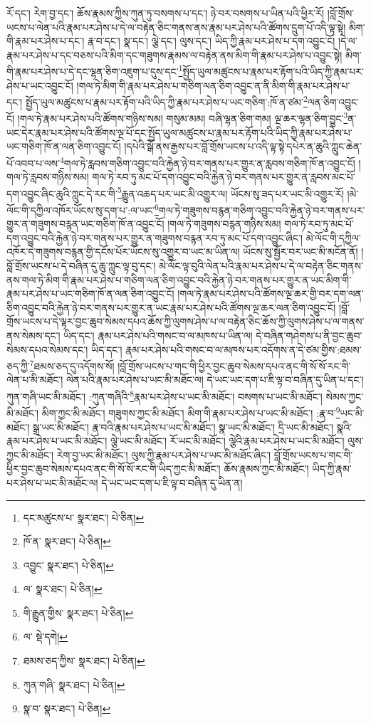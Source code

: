 རོ་དང་། རེག་བྱ་དང་། ཆོས་རྣམས་ཀྱིས་ཀུན་ཏུ་བསགས་པ་དང་། ཉེ་བར་བསགས་པ་ཡིན་པའི་ཕྱིར་རོ། །བློ་གྲོས་ཡངས་པ་ལེན་པའི་རྣམ་པར་ཤེས་པ་དེ་ལ་བརྟེན་ཅིང་གནས་ནས་རྣམ་པར་ཤེས་པའི་ཚོགས་དྲུག་པོ་འདི་ལྟ་སྟེ། མིག་གི་རྣམ་པར་ཤེས་པ་དང་། རྣ་བ་དང་། སྣ་དང་། ལྕེ་དང་། ལུས་དང་། ཡིད་ཀྱི་རྣམ་པར་ཤེས་པ་དག་འབྱུང་ངོ། །དེ་ལ་རྣམ་པར་ཤེས་པ་དང་བཅས་པའི་མིག་དང་གཟུགས་རྣམས་ལ་བརྟེན་ནས་མིག་གི་རྣམ་པར་ཤེས་པ་འབྱུང་སྟེ། མིག་གི་རྣམ་པར་ཤེས་པ་དེ་དང་ལྷན་ཅིག་འཇུག་པ་དུས་དང་\footnote{དང་མཚུངས་པ་  སྣར་ཐང་།  པེ་ཅིན། }སྤྱོད་ཡུལ་མཚུངས་པ་རྣམ་པར་རྟོག་པའི་ཡིད་ཀྱི་རྣམ་པར་ཤེས་པ་ཡང་འབྱུང་ངོ། །གལ་ཏེ་མིག་གི་རྣམ་པར་ཤེས་པ་གཅིག་ལན་ཅིག་འབྱུང་ན་ནི་མིག་གི་རྣམ་པར་ཤེས་པ་དང་། སྤྱོད་ཡུལ་མཚུངས་པ་རྣམ་པར་རྟོག་པའི་ཡིད་ཀྱི་རྣམ་པར་ཤེས་པ་ཡང་གཅིག་:ཁོ་ན་ཙམ་\footnote{ཁོ་ན་  སྣར་ཐང་།  པེ་ཅིན། }ལན་ཅིག་འབྱུང་ངོ། །གལ་ཏེ་རྣམ་པར་ཤེས་པའི་ཚོགས་གཉིས་སམ། གསུམ་མམ། བཞི་ལྷན་ཅིག་གམ། ལྔ་ཆར་ལྷན་ཅིག་བྱུང་\footnote{འབྱུང་  སྣར་ཐང་།  པེ་ཅིན། }ན་ཡང་དེར་རྣམ་པར་ཤེས་པའི་ཚོགས་ལྔ་པོ་དང་སྤྱོད་ཡུལ་མཚུངས་པ་རྣམ་པར་རྟོག་པའི་ཡིད་ཀྱི་རྣམ་པར་ཤེས་པ་ཡང་གཅིག་ཁོ་ན་ལན་ཅིག་འབྱུང་ངོ། །དཔེའི་སྒོ་ནས་རྒྱས་པར་བློ་གྲོས་ཡངས་པ་འདི་ལྟ་སྟེ་དཔེར་ན་ཆུའི་ཀླུང་ཆེན་པོ་འབབ་པ་ལས་\footnote{ལ་  སྣར་ཐང་།  པེ་ཅིན། }གལ་ཏེ་རླབས་གཅིག་འབྱུང་བའི་རྐྱེན་ཉེ་བར་གནས་པར་གྱུར་ན་རླབས་གཅིག་ཁོ་ན་འབྱུང་ངོ། །གལ་ཏེ་རླབས་གཉིས་སམ། གལ་ཏེ་རབ་ཏུ་མང་པོ་དག་འབྱུང་བའི་རྐྱེན་ཉེ་བར་གནས་པར་གྱུར་ན་རླབས་མང་པོ་དག་འབྱུང་ཞིང་ཆུའི་ཀླུང་དེ་རང་གི་\footnote{གི་རྒྱུན་གྱིས་  སྣར་ཐང་།  པེ་ཅིན། }རྒྱུན་འཆད་པར་ཡང་མི་འགྱུར་ལ། ཡོངས་སུ་ཟད་པར་ཡང་མི་འགྱུར་རོ། །མེ་ལོང་གི་དཀྱིལ་འཁོར་ཡོངས་སུ་དག་པ་:ལ་ཡང་\footnote{ལ་  སྡེ་དགེ། }གལ་ཏེ་གཟུགས་བརྙན་གཅིག་འབྱུང་བའི་རྐྱེན་ཉེ་བར་གནས་པར་གྱུར་ན་གཟུགས་བརྙན་ཡང་གཅིག་ཁོ་ན་འབྱུང་ངོ། །གལ་ཏེ་གཟུགས་བརྙན་གཉིས་སམ། གལ་ཏེ་རབ་ཏུ་མང་པོ་དག་འབྱུང་བའི་རྐྱེན་ཉེ་བར་གནས་པར་གྱུར་ན་གཟུགས་བརྙན་རབ་ཏུ་མང་པོ་དག་འབྱུང་ཞིང་། མེ་ལོང་གི་དཀྱིལ་འཁོར་དེ་གཟུགས་བརྙན་གྱི་དངོས་པོར་ཡོངས་སུ་འགྱུར་བ་ཡང་མ་ཡིན་ལ། ཡོངས་སུ་སྦྱོར་བར་ཡང་མི་མངོན་ནོ། །བློ་གྲོས་ཡངས་པ་དེ་བཞིན་དུ་ཆུ་ཀླུང་ལྟ་བུ་དང་། མེ་ལོང་ལྟ་བུའི་ལེན་པའི་རྣམ་པར་ཤེས་པ་དེ་ལ་བརྟེན་ཅིང་གནས་ནས་གལ་ཏེ་མིག་གི་རྣམ་པར་ཤེས་པ་གཅིག་ལན་ཅིག་འབྱུང་བའི་རྐྱེན་ཉེ་བར་གནས་པར་གྱུར་ན་ཡང་མིག་གི་རྣམ་པར་ཤེས་པ་ཡང་གཅིག་ཁོ་ན་ལན་ཅིག་འབྱུང་ངོ། །གལ་ཏེ་རྣམ་པར་ཤེས་པའི་ཚོགས་ལྔ་ཆར་གྱི་བར་དག་ལན་ཅིག་འབྱུང་བའི་རྐྱེན་ཉེ་བར་གནས་པར་གྱུར་ན་ཡང་རྣམ་པར་ཤེས་པའི་ཚོགས་ལྔ་ཆར་ལན་ཅིག་འབྱུང་ངོ། །བློ་གྲོས་ཡངས་པ་དེ་ལྟར་བྱང་ཆུབ་སེམས་དཔའ་ཆོས་ཀྱི་ལུགས་ཤེས་པ་ལ་བརྟེན་ཅིང་ཆོས་ཀྱི་ལུགས་ཤེས་པ་ལ་གནས་ནས་སེམས་དང་། ཡིད་དང་། རྣམ་པར་ཤེས་པའི་གསང་བ་ལ་མཁས་པ་ཡིན་ལ། དེ་བཞིན་གཤེགས་པ་ནི་བྱང་ཆུབ་སེམས་དཔའ་སེམས་དང་། ཡིད་དང་། རྣམ་པར་ཤེས་པའི་གསང་བ་ལ་མཁས་པར་འདོགས་ན་དེ་ཙམ་གྱིས་:ཐམས་ཅད་ཀྱི་\footnote{ཐམས་ཅད་ཀྱིས་  སྣར་ཐང་།  པེ་ཅིན། }ཐམས་ཅད་དུ་འདོགས་སོ། །བློ་གྲོས་ཡངས་པ་གང་གི་ཕྱིར་བྱང་ཆུབ་སེམས་དཔའ་ནང་གི་སོ་སོ་རང་གི་ལེན་པ་མི་མཐོང་། ལེན་པའི་རྣམ་པར་ཤེས་པ་ཡང་མི་མཐོང་ལ། དེ་ཡང་ཡང་དག་པ་ཇི་ལྟ་བ་བཞིན་དུ་ཡིན་པ་དང་། ཀུན་གཞི་ཡང་མི་མཐོང་། :ཀུན་གཞིའི་\footnote{ཀུན་གཞི་  སྣར་ཐང་།  པེ་ཅིན། }རྣམ་པར་ཤེས་པ་ཡང་མི་མཐོང་། བསགས་པ་ཡང་མི་མཐོང་། སེམས་ཀྱང་མི་མཐོང་། མིག་ཀྱང་མི་མཐོང་། གཟུགས་ཀྱང་མི་མཐོང་། མིག་གི་རྣམ་པར་ཤེས་པ་ཡང་མི་མཐོང་། :རྣ་བ་\footnote{སྣ་བ་  སྣར་ཐང་།  པེ་ཅིན། }ཡང་མི་མཐོང་། སྒྲ་ཡང་མི་མཐོང་། རྣ་བའི་རྣམ་པར་ཤེས་པ་ཡང་མི་མཐོང་། སྣ་ཡང་མི་མཐོང་། དྲི་ཡང་མི་མཐོང་། སྣའི་རྣམ་པར་ཤེས་པ་ཡང་མི་མཐོང་། ལྕེ་ཡང་མི་མཐོང་། རོ་ཡང་མི་མཐོང་། ལྕེའི་རྣམ་པར་ཤེས་པ་ཡང་མི་མཐོང་། ལུས་ཀྱང་མི་མཐོང་། རེག་བྱ་ཡང་མི་མཐོང་། ལུས་ཀྱི་རྣམ་པར་ཤེས་པ་ཡང་མི་མཐོང་ཞིང་། བློ་གྲོས་ཡངས་པ་གང་གི་ཕྱིར་བྱང་ཆུབ་སེམས་དཔའ་ནང་གི་སོ་སོ་རང་གི་ཡིད་ཀྱང་མི་མཐོང་། ཆོས་རྣམས་ཀྱང་མི་མཐོང་། ཡིད་ཀྱི་རྣམ་པར་ཤེས་པ་ཡང་མི་མཐོང་ལ། དེ་ཡང་ཡང་དག་པ་ཇི་ལྟ་བ་བཞིན་དུ་ཡིན་ན། 